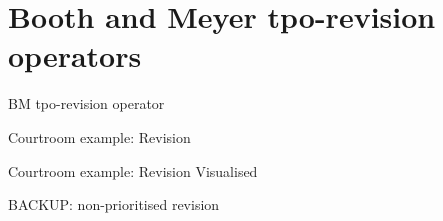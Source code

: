 \documentclass[11pt]{beamer}
\begin{document}
\section{Booth and Meyer tpo-revision operators}

\begin{frame}{BM tpo-revision operator}
\end{frame}

\begin{frame}{Courtroom example: Revision}
\end{frame}

\begin{frame}{Courtroom example: Revision Visualised}
\end{frame}

\begin{frame}{BACKUP: non-prioritised revision}
\end{frame}
\end{document}
